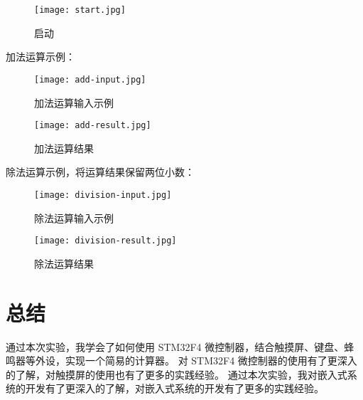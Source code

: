 \documentclass{theme-2639013-final}
\begin{document}
\begin{figure}[H]
  \centering\texttt{[image: start.jpg]}
  \caption{启动}
\end{figure}

加法运算示例：

\begin{figure}[H]
  \centering\texttt{[image: add-input.jpg]}
  \caption{加法运算输入示例}
\end{figure}

\begin{figure}[H]
  \centering\texttt{[image: add-result.jpg]}
  \caption{加法运算结果}
\end{figure}

除法运算示例，将运算结果保留两位小数：

\begin{figure}[H]
  \centering\texttt{[image: division-input.jpg]}
  \caption{除法运算输入示例}
\end{figure}

\begin{figure}[H]
  \centering\texttt{[image: division-result.jpg]}
  \caption{除法运算结果}
\end{figure}

\section{总结}

通过本次实验，我学会了如何使用 STM32F4 微控制器，结合触摸屏、键盘、蜂鸣器等外设，实现一个简易的计算器。
对 STM32F4 微控制器的使用有了更深入的了解，对触摸屏的使用也有了更多的实践经验。
通过本次实验，我对嵌入式系统的开发有了更深入的了解，对嵌入式系统的开发有了更多的实践经验。
\end{document}
